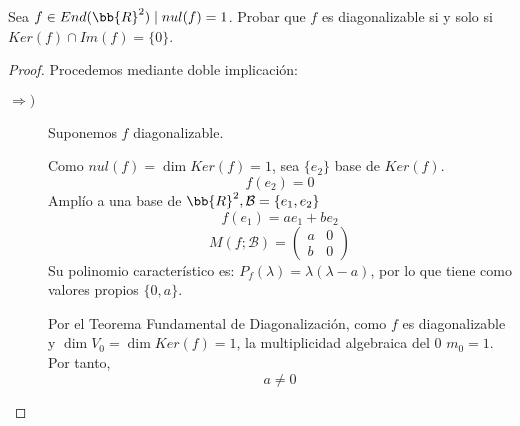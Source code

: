 \begin{ejercicio}
    Sea $f\in End(\bb{R}^2) \mid nul(f) = 1$. Probar que $f$ es diagonalizable si y solo si $Ker(f) \cap Im(f) = \{0\}$.
    \begin{proof}Procedemos mediante doble implicación:
        \begin{description}
            \item [$\Longrightarrow )$]Suponemos $f$ diagonalizable.
            
            Como $nul(f) = \dim Ker(f) = 1$, sea $\{e_2\}$ base de $Ker(f)$.
            $$f(e_2) = 0$$
            Amplío a una base de $\bb{R}^2, \mathcal{B} = \{e_1,e_2\}$
            $$f(e_1) = ae_1 + be_2$$
            $$M(f;\mathcal{B}) = \left(\begin{array}{cc}
                a & 0 \\
                b & 0
            \end{array} \right)$$
            Su polinomio característico es: $P_f(\lambda) = \lambda(\lambda-a)$, por lo que tiene como valores propios $\{0,a\}$.
        
            Por el Teorema Fundamental de Diagonalización, como $f$ es diagonalizable y $\dim V_0 = \dim Ker(f) = 1$, la multiplicidad algebraica del 0 $m_0 = 1$. Por tanto, $$a\neq 0$$


\end{description}
\end{proof}
\end{ejercicio}
